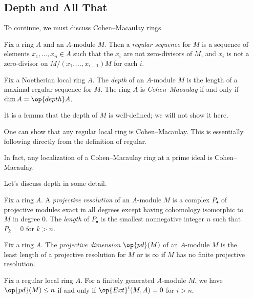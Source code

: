 \documentclass[../notes.tex]{subfiles}
\begin{document}
\subsection{Depth and All That}
To continue, we must discuss Cohen--Macaulay rings.
\begin{definition}
	Fix a ring $A$ and an $A$-module $M$. Then a \textit{regular sequence} for $M$ is a sequence of elements $x_1,\ldots,x_n\in A$ such that the $x_i$ are not zero-divisors of $M$, and $x_i$ is not a zero-divisor on $M/(x_1,\ldots,x_{i-1})M$ for each $i$.
\end{definition}
\begin{definition}
	Fix a Noetherian local ring $A$. The \textit{depth} of an $A$-module $M$ is the length of a maximal regular sequence for $M$. The ring $A$ is \textit{Cohen--Macaulay} if and only if $\dim A=\op{depth}A$.
\end{definition}
It is a lemma that the depth of $M$ is well-defined; we will not show it here.
\begin{remark}
	One can show that any regular local ring is Cohen--Macaulay. This is essentially following directly from the definition of regular.
\end{remark}
\begin{remark}
	In fact, any localization of a Cohen--Macaulay ring at a prime ideal is Cohen--Macaulay.
\end{remark}
Let's discuss depth in some detail.
\begin{definition}
	Fix a ring $A$. A \textit{projective resolution} of an $A$-module $M$ is a complex $P_\bullet$ of projective modules exact in all degrees except having cohomology isomorphic to $M$ in degree $0$. The \textit{length} of $P_\bullet$ is the smallest nonnegative integer $n$ such that $P_k=0$ for $k>n$.
\end{definition}
\begin{definition}
	Fix a ring $A$. The \textit{projective dimension} $\op{pd}(M)$ of an $A$-module $M$ is the least length of a projective resolution for $M$  or is $\infty$ if $M$ has no finite projective resolution.
\end{definition}
\begin{proposition} \label{prop:local-ext-bounds-pd}
	Fix a regular local ring $A$. For a finitely generated $A$-module $M$, we have $\op{pd}(M)\le n$ if and only if $\op{Ext}^i(M,A)=0$ for $i>n$.
\end{proposition}
\end{document}
